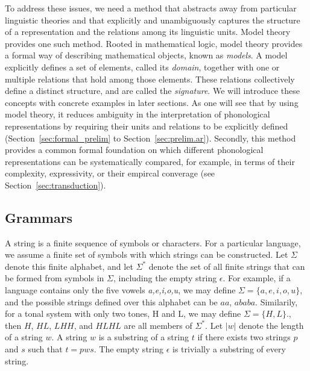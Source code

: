 To address these issues, we need a method that abstracts away from 
particular linguistic theories and that explicitly and unambiguously captures 
the structure of a representation and the relations among its linguistic 
units. Model theory provides one such method. Rooted in mathematical 
logic, model theory provides a formal way of describing mathematical 
objects, known as \textit{models}. A model explicitly defines a set of 
elements, called its \textit{domain}, together with one or multiple 
relations that hold among those elements. These relations collectively
define a distinct structure, and are called the \textit{signature}. We
will introduce these concepts with concrete examples in later sections.
As one will see that by using model theory, it reduces ambiguity in the 
interpretation of phonological representations by requiring their units 
and relations to be explicitly defined (Section~\ref{sec:formal_prelim} to
Section~\ref{sec:prelim.ar}). Secondly, this method provides a common 
formal foundation on which different phonological representations can be systematically compared, for example, in terms of their complexity, expressivity, or their empircal converage (see Section~\ref{sec:transduction}).


\subsection{Grammars}
A string is a finite sequence of symbols or characters. For a 
particular language, we assume a finite set of symbols with which 
strings can be constructed. Let \(\Sigma\) denote this finite 
alphabet, and let \(\Sigma^*\) denote the set of all finite strings 
that can be formed from symbols in \(\Sigma\), including the empty 
string \(\epsilon\). For example, if a language contains only the five 
vowels \textit{a,e,i,o,u}, we may define \(\Sigma=\{a,e,i,o,u\}\), and
the possible strings defined over this alphabet can be \(aa\), \(ababa\). Similarily, for a tonal system with only two tones, H and L, 
we may define \(\Sigma=\{H,L\}.\), then \(H\), \(HL\), \(LHH\), and \(HLHL\) are all members of \(\Sigma^*\). Let $|w|$ denote the length of a string $w$. A string 
\(w\) is a substring of a string \(t\) if there exists 
two strings \(p\) and \(s\) such that \(t = pws\).
The empty string $\epsilon$ is trivially a substring of every string.

